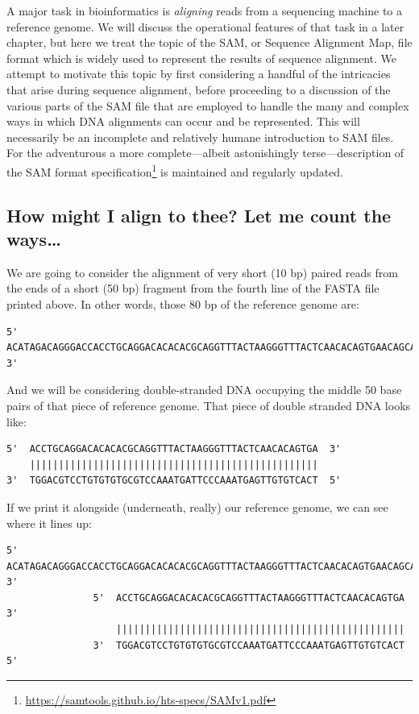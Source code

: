 \documentclass[]{krantz}
\renewcommand{\href}[2]{#2\footnote{\url{#1}}}
\begin{document}
A major task in bioinformatics is \emph{aligning} reads from a sequencing machine
to a reference genome. We will discuss the operational features of that task
in a later chapter, but here we treat the topic of the SAM, or
Sequence Alignment Map, file format which is widely used to represent the results of
sequence alignment. We attempt to motivate this topic by first considering a handful
of the intricacies that arise during sequence alignment, before proceeding
to a discussion of the various parts of the SAM file that are employed to handle
the many and complex ways in which DNA alignments can occur and be represented.
This will necessarily be an incomplete and relatively humane introduction to SAM files.
For the adventurous a more complete---albeit astonishingly terse---description of the
\href{https://samtools.github.io/hts-specs/SAMv1.pdf}{SAM format specification}
is maintained and regularly updated.

\hypertarget{how-might-i-align-to-thee-let-me-count-the-ways}{%
\subsection{How might I align to thee? Let me count the ways\ldots{}}\label{how-might-i-align-to-thee-let-me-count-the-ways}}

We are going to consider the alignment of very short (10 bp)
paired reads from the ends of a short (50 bp) fragment from
the fourth line of the FASTA file printed above. In other words,
those 80 bp of the reference genome are:

\begin{verbatim}
5'  ACATAGACAGGGACCACCTGCAGGACACACACGCAGGTTTACTAAGGGTTTACTCAACACAGTGAACAGCATATACCAGA  3'
\end{verbatim}

And we will be considering double-stranded DNA occupying the middle 50 base
pairs of that piece of reference genome. That piece of double stranded
DNA looks like:

\begin{verbatim}
5'  ACCTGCAGGACACACACGCAGGTTTACTAAGGGTTTACTCAACACAGTGA  3'
    ||||||||||||||||||||||||||||||||||||||||||||||||||
3'  TGGACGTCCTGTGTGTGCGTCCAAATGATTCCCAAATGAGTTGTGTCACT  5'
\end{verbatim}

If we print it alongside (underneath, really) our reference genome,
we can see where it lines up:

\begin{verbatim}
5'  ACATAGACAGGGACCACCTGCAGGACACACACGCAGGTTTACTAAGGGTTTACTCAACACAGTGAACAGCATATACCAGA  3'
               5'  ACCTGCAGGACACACACGCAGGTTTACTAAGGGTTTACTCAACACAGTGA  3'
                   ||||||||||||||||||||||||||||||||||||||||||||||||||
               3'  TGGACGTCCTGTGTGTGCGTCCAAATGATTCCCAAATGAGTTGTGTCACT  5'
\end{verbatim}
\end{document}
